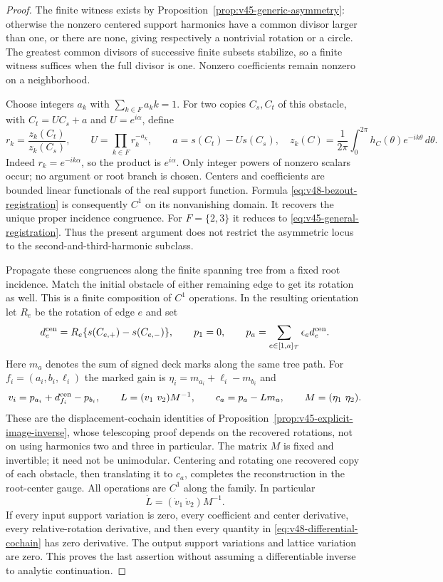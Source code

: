 \begin{proof}
The finite witness exists by
Proposition~\ref{prop:v45-generic-asymmetry}: otherwise the nonzero
centered support harmonics have a common divisor larger than one, or
there are none, giving respectively a nontrivial rotation or a circle.
The greatest common divisors of successive finite subsets stabilize,
so a finite witness suffices when the full divisor is one.  Nonzero
coefficients remain nonzero on a neighborhood.

Choose integers $a_k$ with $\sum_{k\in F}a_kk=1$.  For two copies
$C_s,C_t$ of this obstacle, with $C_t=UC_s+a$ and
$U=e^{i\alpha}$, define
\begin{equation}\label{eq:v48-bezout-registration}
 r_k=\frac{z_k(C_t)}{z_k(C_s)},\qquad
 U=\prod_{k\in F}r_k^{-a_k},\qquad
 a=s(C_t)-Us(C_s),
 \quad z_k(C)=\frac1{2\pi}\int_0^{2\pi}h_C(\theta)e^{-ik\theta}\,d\theta.
\end{equation}
Indeed $r_k=e^{-ik\alpha}$, so the product is $e^{i\alpha}$.
Only integer powers of nonzero scalars occur; no argument or root
branch is chosen.  Centers and coefficients are bounded linear
functionals of the real support function.  Formula
\eqref{eq:v48-bezout-registration} is consequently $C^1$ on its
nonvanishing domain.  It recovers the unique proper incidence
congruence.  For $F=\{2,3\}$ it reduces to
\eqref{eq:v45-general-registration}.  Thus the present argument does
not restrict the asymmetric locus to the second-and-third-harmonic
subclass.

Propagate these congruences along the finite spanning tree from a fixed
root incidence.  Match the initial obstacle of either remaining edge
to get its rotation as well.  This is a finite composition of $C^1$
operations.  In the resulting orientation let $R_e$ be the rotation of
edge $e$ and set
\[
 d_e^{\rm cen}=R_e\{s(C_{e,+})-s(C_{e,-})\},\qquad
 p_1=0,\qquad p_a=\sum_{e\in[1,a]_{\mathcal T}}\epsilon_e d_e^{\rm cen}.
\]
Here $m_a$ denotes the sum of signed deck marks along the same tree
path.  For $f_i=(a_i,b_i,\ell_i)$ the marked gain is
$\eta_i=m_{a_i}+\ell_i-m_{b_i}$ and
\begin{equation}\label{eq:v48-differential-cochain}
 v_i=p_{a_i}+d_{f_i}^{\rm cen}-p_{b_i},\qquad
 L=(v_1\ v_2)M^{-1},\qquad c_a=p_a-Lm_a,
 \qquad M=(\eta_1\ \eta_2).
\end{equation}
These are the displacement-cochain identities of
Proposition~\ref{prop:v45-explicit-image-inverse}, whose telescoping
proof depends on the recovered rotations, not on using harmonics two
and three in particular.  The matrix $M$ is fixed and invertible; it
need not be unimodular.  Centering and rotating one recovered copy of
each obstacle, then translating it to $c_a$, completes the
reconstruction in the root-center gauge.  All operations are $C^1$
along the family.  In particular
\[
                  \dot L=(\dot v_1\ \dot v_2)M^{-1}.
\]
If every input support variation is zero, every coefficient and center
derivative, every relative-rotation derivative, and then every quantity
in \eqref{eq:v48-differential-cochain} has zero derivative.  The output
support variations and lattice variation are zero.  This proves the
last assertion without assuming a differentiable inverse to analytic
continuation.


\end{proof}
